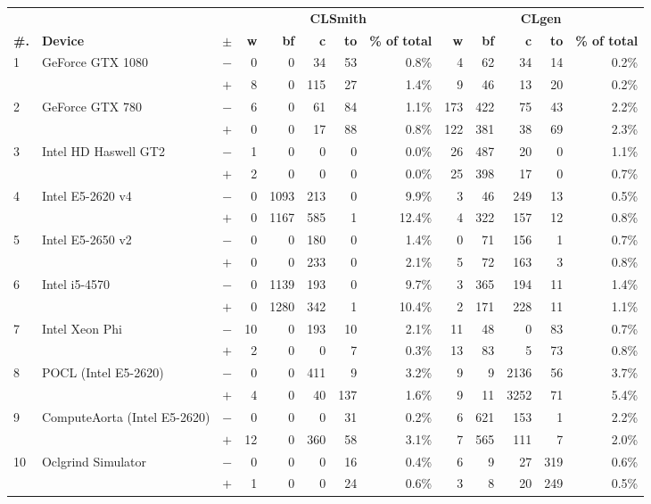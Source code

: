   \begin{tabular}{lll | rrrrr | rrrrr }
  \toprule
  & & & \multicolumn{5}{c|}{\textbf{CLSmith}} & \multicolumn{5}{c}{\textbf{CLgen}} \\
  \textbf{\#.} & \textbf{Device} & $\pm$ &
  \textbf{w} & \textbf{bf} & \textbf{c} & \textbf{to} & \textbf{\% of total} &
  \textbf{w} & \textbf{bf} & \textbf{c} & \textbf{to} & \textbf{\% of total} \\
  \midrule
  \multirow{ 2}{*}{1} & \multirow{ 2}{*}{GeForce GTX 1080} & $-$ & 0 & 0 & 34 & 53 & 0.8\%       & 4 & 62 & 34 & 14 & 0.2\% \\& & $+$ & 8 & 0 & 115 & 27 & 1.4\% & 9 & 46 & 13 & 20 & 0.2\% \\
\hline
\multirow{ 2}{*}{2} & \multirow{ 2}{*}{GeForce GTX 780} & $-$ & 6 & 0 & 61 & 84 & 1.1\%       & 173 & 422 & 75 & 43 & 2.2\% \\& & $+$ & 0 & 0 & 17 & 88 & 0.8\% & 122 & 381 & 38 & 69 & 2.3\% \\
\hline
\multirow{ 2}{*}{3} & \multirow{ 2}{*}{Intel HD Haswell GT2} & $-$ & 1 & 0 & 0 & 0 & 0.0\%       & 26 & 487 & 20 & 0 & 1.1\% \\& & $+$ & 2 & 0 & 0 & 0 & 0.0\% & 25 & 398 & 17 & 0 & 0.7\% \\
\hline
\multirow{ 2}{*}{4} & \multirow{ 2}{*}{Intel E5-2620 v4} & $-$ & 0 & 1093 & 213 & 0 & 9.9\%       & 3 & 46 & 249 & 13 & 0.5\% \\& & $+$ & 0 & 1167 & 585 & 1 & 12.4\% & 4 & 322 & 157 & 12 & 0.8\% \\
\hline
\multirow{ 2}{*}{5} & \multirow{ 2}{*}{Intel E5-2650 v2} & $-$ & 0 & 0 & 180 & 0 & 1.4\%       & 0 & 71 & 156 & 1 & 0.7\% \\& & $+$ & 0 & 0 & 233 & 0 & 2.1\% & 5 & 72 & 163 & 3 & 0.8\% \\
\hline
\multirow{ 2}{*}{6} & \multirow{ 2}{*}{Intel i5-4570} & $-$ & 0 & 1139 & 193 & 0 & 9.7\%       & 3 & 365 & 194 & 11 & 1.4\% \\& & $+$ & 0 & 1280 & 342 & 1 & 10.4\% & 2 & 171 & 228 & 11 & 1.1\% \\
\hline
\multirow{ 2}{*}{7} & \multirow{ 2}{*}{Intel Xeon Phi} & $-$ & 10 & 0 & 193 & 10 & 2.1\%       & 11 & 48 & 0 & 83 & 0.7\% \\& & $+$ & 2 & 0 & 0 & 7 & 0.3\% & 13 & 83 & 5 & 73 & 0.8\% \\
\hline
\multirow{ 2}{*}{8} & \multirow{ 2}{*}{POCL (Intel E5-2620)} & $-$ & 0 & 0 & 411 & 9 & 3.2\%       & 9 & 9 & 2136 & 56 & 3.7\% \\& & $+$ & 4 & 0 & 40 & 137 & 1.6\% & 9 & 11 & 3252 & 71 & 5.4\% \\
\hline
\multirow{ 2}{*}{9} & \multirow{ 2}{*}{ComputeAorta (Intel E5-2620)} & $-$ & 0 & 0 & 0 & 31 & 0.2\%       & 6 & 621 & 153 & 1 & 2.2\% \\& & $+$ & 12 & 0 & 360 & 58 & 3.1\% & 7 & 565 & 111 & 7 & 2.0\% \\
\hline
\multirow{ 2}{*}{10} & \multirow{ 2}{*}{Oclgrind Simulator} & $-$ & 0 & 0 & 0 & 16 & 0.4\%       & 6 & 9 & 27 & 319 & 0.6\% \\& & $+$ & 1 & 0 & 0 & 24 & 0.6\% & 3 & 8 & 20 & 249 & 0.5\% \\
  \bottomrule
\end{tabular}

